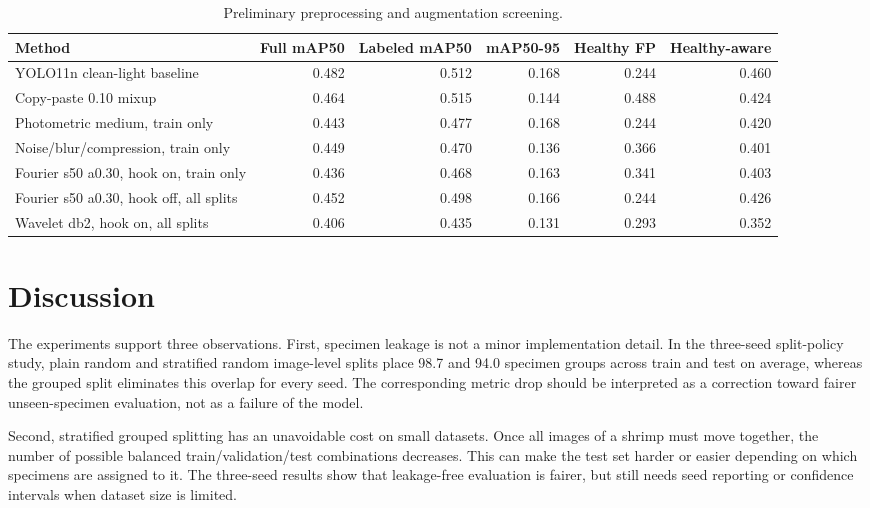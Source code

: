 \documentclass{svproc}
\begin{document}
\begin{table}
\caption{Preliminary preprocessing and augmentation screening.}
\label{tab:preproc_partial}
\begin{center}
\scriptsize
\begin{tabular}{lrrrrr}
\hline
Method & Full mAP50 & Labeled mAP50 & mAP50-95 & Healthy FP & Healthy-aware \\
\hline
YOLO11n clean-light baseline & 0.482 & 0.512 & 0.168 & 0.244 & 0.460 \\
Copy-paste 0.10 mixup & 0.464 & 0.515 & 0.144 & 0.488 & 0.424 \\
Photometric medium, train only & 0.443 & 0.477 & 0.168 & 0.244 & 0.420 \\
Noise/blur/compression, train only & 0.449 & 0.470 & 0.136 & 0.366 & 0.401 \\
Fourier s50 a0.30, hook on, train only & 0.436 & 0.468 & 0.163 & 0.341 & 0.403 \\
Fourier s50 a0.30, hook off, all splits & 0.452 & 0.498 & 0.166 & 0.244 & 0.426 \\
Wavelet db2, hook on, all splits & 0.406 & 0.435 & 0.131 & 0.293 & 0.352 \\
\hline
\end{tabular}
\end{center}
\end{table}

\section{Discussion}

The experiments support three observations. First, specimen leakage is
not a minor implementation detail. In the three-seed split-policy study,
plain random and stratified random image-level splits place 98.7 and
94.0 specimen groups across train and test on average, whereas the
grouped split eliminates this overlap for every seed. The corresponding
metric drop should be interpreted as a correction toward fairer
unseen-specimen evaluation, not as a failure of the model.

Second, stratified grouped splitting has an unavoidable cost on small
datasets. Once all images of a shrimp must move together, the number of
possible balanced train/validation/test combinations decreases. This
can make the test set harder or easier depending on which specimens are
assigned to it. The three-seed results show that leakage-free
evaluation is fairer, but still needs seed reporting or confidence
intervals when dataset size is limited.
\end{document}
